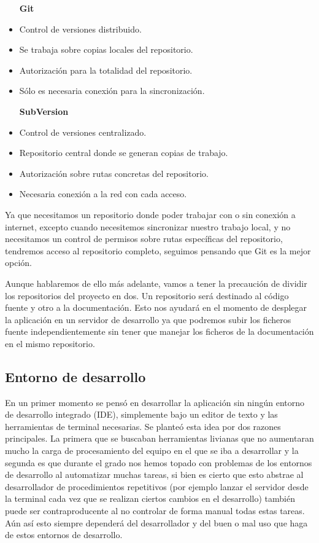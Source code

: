 \begin{itemize}
\item [\textbf{Git}]
\item Control de versiones distribuido.
\item Se trabaja sobre copias locales del repositorio.
\item Autorización para la totalidad del repositorio.
\item Sólo es necesaria conexión para la sincronización.
\item [\textbf{SubVersion}]
\item Control de versiones centralizado.
\item Repositorio central donde se generan copias de trabajo.
\item Autorización sobre rutas concretas del repositorio.
\item Necesaria conexión a la red con cada acceso.
\end{itemize}


Ya que necesitamos un repositorio donde poder trabajar con o sin conexión a internet, excepto cuando necesitemos sincronizar nuestro trabajo local, y no necesitamos un control de permisos sobre rutas específicas del repositorio, tendremos acceso al repositorio completo, seguimos pensando que Git es la mejor opción.

\bigskip
Aunque hablaremos de ello más adelante, vamos a tener la precaución de dividir los repositorios del proyecto en dos. Un repositorio será destinado al código fuente y otro a la documentación. Esto nos ayudará en el momento de desplegar la aplicación en un servidor de desarrollo ya que podremos subir los ficheros fuente independientemente sin tener que manejar los ficheros de la documentación en el mismo repositorio.



\subsection{Entorno de desarrollo}

En un primer momento se pensó en desarrollar la aplicación sin ningún entorno de desarrollo integrado (IDE), simplemente bajo un editor de texto y las herramientas de terminal necesarias. Se planteó esta idea por dos razones principales. La primera que se buscaban herramientas livianas que no aumentaran mucho la carga de procesamiento del equipo en el que se iba a desarrollar y la segunda es que durante el grado nos hemos topado con problemas de los entornos de desarrollo al automatizar muchas tareas, si bien es cierto que esto abstrae al desarrollador de procedimientos repetitivos (por ejemplo lanzar el servidor desde la terminal cada vez que se realizan ciertos cambios en el desarrollo) también puede ser contraproducente al no controlar de forma manual todas estas tareas. Aún así esto siempre dependerá del desarrollador y del buen o mal uso que haga de estos entornos de desarrollo.

